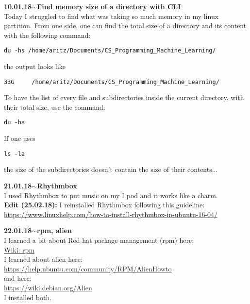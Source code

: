 \documentclass[11pt,a4paper]{article}
\newenvironment{loggentry}[2]%
{\noindent\textbf{#1}\hspace{1cm}$\mathbf{\sim}$\text{ }\textbf{#2}\\}{\vspace{0.5cm}}
\begin{document}
\begin{loggentry}{10.01.18}{Find memory size of a directory with CLI}
Today I struggled to find what was taking so much memory in my linux partition. From one side, one can find the total size of a directory and its content with the following command:\\
\begin{verbatim}
du -hs /home/aritz/Documents/CS_Programming_Machine_Learning/
\end{verbatim}
the output looks like
\begin{verbatim}
33G     /home/aritz/Documents/CS_Programming_Machine_Learning/
\end{verbatim}
To have the list of every file and subdirectories inside the current directory, with their total size, use the command:
\begin{verbatim}
du -ha
\end{verbatim}
If one uses
\begin{verbatim}
ls -la
\end{verbatim}
the size of the subdirectories doesn't contain the size of their contents...\\
\end{loggentry}

\begin{loggentry}{21.01.18}{Rhythmbox}
I used Rhythmbox to put music on my I pod and it works like a charm.\\
\textbf{Edit (25.02.18):} I reinstalled Rhythmbox following this guideline:\\
\url{https://www.linuxhelp.com/how-to-install-rhythmbox-in-ubuntu-16-04/}\\

\end{loggentry}

\begin{loggentry}{22.01.18}{rpm, alien}
I learned a bit about Red hat package management (rpm) here:\\
\href{https://en.wikipedia.org/wiki/Rpm_(software)}{Wiki: rpm}\\
I learned about alien here:\\
\url{https://help.ubuntu.com/community/RPM/AlienHowto}\\
and here:\\
\url{https://wiki.debian.org/Alien}\\
I installed both.
\end{loggentry}
\end{document}
